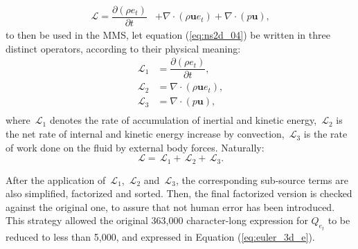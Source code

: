 \documentclass[10pt]{article}
\newcommand{\Diff}[2] {\dfrac{\partial( #1)}{\partial #2}}
\newcommand{\bv}[1]{\ensuremath{\mbox{\boldmath$ #1 $}}}
\newcommand{\Lo}{\,\mathcal{L}}
\begin{document}
\begin{equation}
 \label{eq:ns2d_04}
\begin{split}
\Lo= \Diff{\rho e_t}{t}&+\nabla \cdot (\rho\mathbf{u}e_t)+ \nabla\cdot(p  \mathbf{u}) ,
\end{split}
\end{equation}
to then be used in the MMS, let equation (\ref{eq:ns2d_04}) be written in three distinct operators, according to their physical meaning:
\begin{equation*}
 \begin{split}
  \Lo_1&=\Diff{\rho e_t}{t} ,\\
  \Lo_2&=\nabla \cdot (\rho\mathbf{u}e_t),\\
  \Lo_3&= \nabla\cdot(p  \mathbf{u}),\\
   \end{split}
\end{equation*}
where $\Lo_1$ denotes the rate of accumulation of inertial and kinetic energy, $\Lo_2$ is the net rate of internal and kinetic energy increase by convection,  $\Lo_3$ is the rate of work done on the fluid by external body forces. Naturally:
$$\Lo=\Lo_1+\Lo_2+\Lo_3.$$



 After the application of $\Lo_1$,  $\Lo_2$ and $\Lo_3$, the corresponding sub-source terms are also simplified, factorized and sorted. Then, the final factorized version is checked against the original one, to assure that not human error has been introduced.  This strategy allowed the original  363,000 character-long  expression for $Q_{e_t}$ to be reduced to less than 5,000, and expressed in Equation (\ref{eq:euler_3d_e}).
\end{document}
